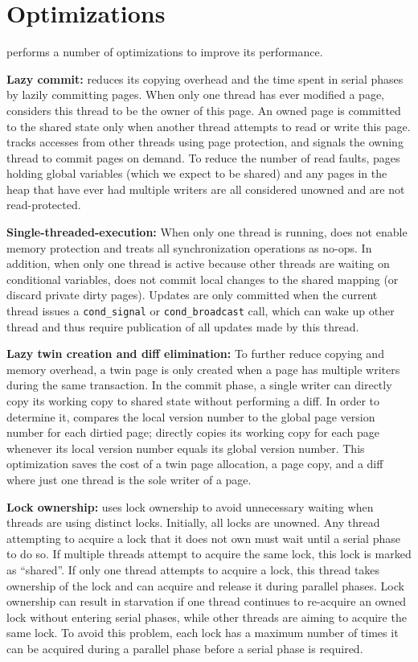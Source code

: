 \section{Optimizations}
\label{sec:dthreads-optimization}

\dthreads{} performs a number of optimizations to improve its performance.

\textbf{Lazy commit:} \dthreads{} reduces its copying overhead and the time spent in serial phases by lazily committing pages. When only one thread has ever modified a page, \dthreads{} considers this thread to be the owner of this page. An owned page is committed to the shared state only when another thread attempts to read or write this page. \dthreads{} tracks accesses from other threads using page protection, and signals the owning thread to commit pages on demand. To reduce the number of read faults, pages holding global variables (which we expect to be shared) and any pages in the heap that have ever had multiple writers are all considered unowned and are not read-protected.

\textbf{Single-threaded-execution: }
When only one thread is running, \dthreads{} does not enable memory protection and treats all synchronization operations as no-ops. In addition, when only one thread is active because other threads are waiting on conditional variables, \dthreads{} does not commit local changes to the shared mapping (or discard private dirty pages). Updates are only committed when the current thread issues a \texttt{cond\_signal} or \texttt{cond\_broadcast} call, which can wake up other thread and thus require publication of all updates made by this thread.

\textbf{Lazy twin creation and diff elimination: }
To further reduce copying and memory overhead, a twin page is only created when a page has multiple writers during the same transaction. In the commit phase, a single writer can directly copy its working copy to shared state without performing a diff. In order to determine it, \dthreads{} compares the local version number to the global page version number for each dirtied page; \dthreads{} directly copies its working copy for each page whenever its local version number equals its global version number. This optimization saves the cost of a twin page allocation, a page copy, and a diff where just one thread is the sole writer of a page.


\textbf{Lock ownership:} \dthreads{} uses lock ownership to avoid unnecessary waiting when threads are using distinct locks. Initially, all locks are unowned. Any thread attempting to acquire a lock that it does not own must wait until a serial phase to do so. If multiple threads attempt to acquire the same lock, this lock is marked as ``shared''. If only one thread attempts to acquire a lock, this thread takes ownership of the lock and can acquire and release it during parallel phases. Lock ownership can result in starvation if one thread continues to re-acquire an owned lock without entering serial phases, while other threads are aiming to acquire the same lock. To avoid this problem, each lock has a maximum number of times it can be acquired during a parallel phase before a serial phase is required.

